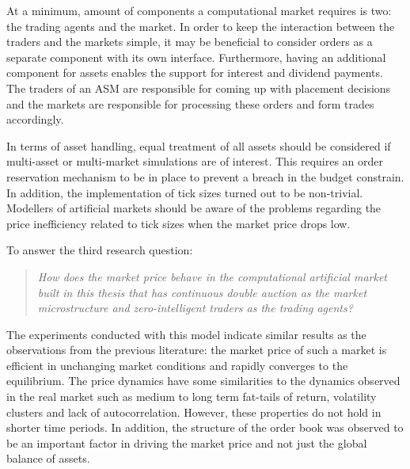 At a minimum, amount of components a computational market requires is two: the trading agents and the 
market. In order to keep the interaction between the traders and the markets simple, it may be beneficial to 
consider orders as a separate component with its own interface. Furthermore, having an additional component for 
assets enables the support for interest and dividend payments. The traders of an ASM are responsible for coming up with 
placement decisions and the markets are responsible for processing these orders and form trades accordingly. 

In terms of asset handling, equal treatment of 
all assets should be considered if multi-asset or multi-market simulations are of interest. 
This requires an order reservation mechanism to be in place to prevent a breach in the 
budget constrain. In addition, the implementation of tick sizes turned out to be non-trivial. 
Modellers of artificial markets should be aware of the problems regarding the price inefficiency 
related to tick sizes when the market price drops low. 


To answer the third research question:
\begin{quote}
    \textit{How does the market price behave in the computational artificial market built in this thesis that has continuous
    double auction as the market microstructure and zero-intelligent traders as the 
    trading agents?} 
\end{quote}
The experiments conducted with this model indicate similar results as the observations from 
the previous literature: the market price of such a market is efficient in unchanging market conditions
and rapidly converges to the equilibrium. The price dynamics have some similarities to the dynamics 
observed in the real market such as medium to long term fat-tails of return, volatility clusters and 
lack of autocorrelation. However, these properties do not hold in shorter time periods. In addition, 
the structure of the order book was observed to be an important factor in driving the market price and 
not just the global balance of assets. 


